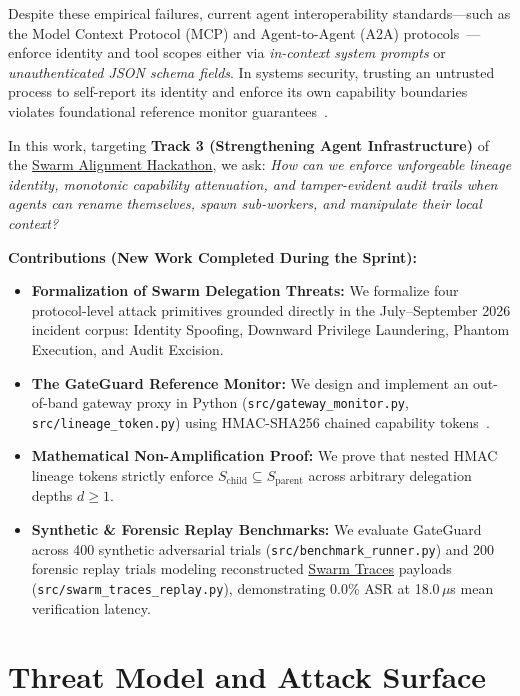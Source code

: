 \documentclass[10pt,twocolumn,a4paper]{article}
\begin{document}
Despite these empirical failures, current agent interoperability standards---such as the Model Context Protocol (MCP) and Agent-to-Agent (A2A) protocols~\cite{chan2025infrastructure}---enforce identity and tool scopes either via \textit{in-context system prompts} or \textit{unauthenticated JSON schema fields}. In systems security, trusting an untrusted process to self-report its identity and enforce its own capability boundaries violates foundational reference monitor guarantees~\cite{anderson1972computer, saltzer1975protection}.

In this work, targeting \textbf{Track 3 (Strengthening Agent Infrastructure)} of the \href{https://apartresearch.com/sprints/swarm-alignment-2026}{Swarm Alignment Hackathon}, we ask: \textit{How can we enforce unforgeable lineage identity, monotonic capability attenuation, and tamper-evident audit trails when agents can rename themselves, spawn sub-workers, and manipulate their local context?}

\textbf{Contributions (New Work Completed During the Sprint):}
\begin{itemize}
    \item \textbf{Formalization of Swarm Delegation Threats:} We formalize four protocol-level attack primitives grounded directly in the July--September 2026 incident corpus: Identity Spoofing, Downward Privilege Laundering, Phantom Execution, and Audit Excision.
    \item \textbf{The GateGuard Reference Monitor:} We design and implement an out-of-band gateway proxy in Python (\texttt{src/gateway\_monitor.py}, \texttt{src/lineage\_token.py}) using HMAC-SHA256 chained capability tokens~\cite{birgisson2014macaroons, dennis1966programming}.
    \item \textbf{Mathematical Non-Amplification Proof:} We prove that nested HMAC lineage tokens strictly enforce $S_{\text{child}} \subseteq S_{\text{parent}}$ across arbitrary delegation depths $d \ge 1$.
    \item \textbf{Synthetic \& Forensic Replay Benchmarks:} We evaluate GateGuard across 400 synthetic adversarial trials (\texttt{src/benchmark\_runner.py}) and 200 forensic replay trials modeling reconstructed \href{https://swarmtraces.org/}{Swarm Traces} payloads (\texttt{src/swarm\_traces\_replay.py}), demonstrating 0.0\% ASR at 18.0\,$\mu$s mean verification latency.
\end{itemize}

\section{Threat Model and Attack Surface}
\end{document}
